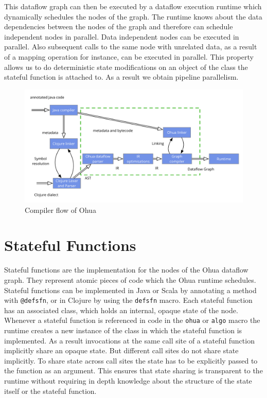 This dataflow graph can then be executed by a dataflow execution runtime which dynamically schedules the nodes of the graph.
The runtime knows about the data dependencies between the nodes of the graph and therefore can schedule independent nodes in parallel.
Data independent nodes can be executed in parallel.
Also subsequent calls to the same node with unrelated data, as a result of a mapping operation for instance, can be executed in parallel.
This property allows us to do deterministic state modifications on an object of the class the stateful function is attached to.
As a result we obtain pipeline parallelism.

\begin{figure}
  \includegraphics[width=\linewidth]{../Figures/ohua-compiler-flow}
  \caption{Compiler flow of Ohua}
  \label{fig:ohua-compiler-flow}
\end{figure}


\section{Stateful Functions}


Stateful functions are the implementation for the nodes of the Ohua dataflow graph.
They represent atomic pieces of code which the Ohua runtime schedules.
Stateful functions can be implemented in Java or Scala\cite{ScalaLanguage} by annotating a method with \texttt{@defsfn}, or in Clojure by using the \texttt{defsfn} macro.
Each stateful function has an associated class, which holds an internal, opaque state of the node.
Whenever a stateful function is referenced in code in the \texttt{ohua} or \texttt{algo} macro the runtime creates a new instance of the class in which the stateful function is implemented.
As a result invocations at the same call site of a stateful function implicitly share an opaque state.
But different call sites do not share state implicitly.
To share state across call sites the state has to be explicitly passed to the function as an argument.
This ensures that state sharing is transparent to the runtime without requiring in depth knowledge about the structure of the state itself or the stateful function.

